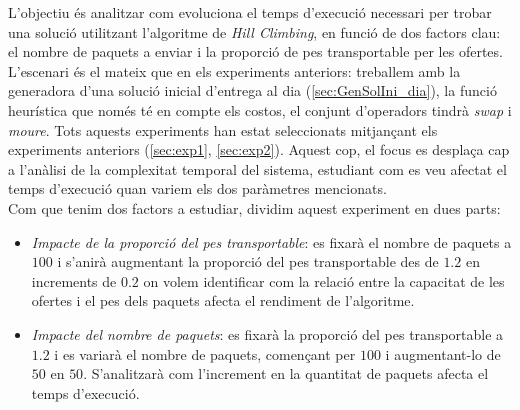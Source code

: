 \documentclass[a4paper]{article}
\begin{document}
	L'objectiu és analitzar com evoluciona el temps d'execució necessari per trobar una solució utilitzant l'algoritme de \textit{Hill Climbing}, en funció de dos factors clau: el nombre de paquets a enviar i la proporció de pes transportable per les ofertes. \\

	L'escenari és el mateix que en els experiments anteriors: treballem amb la generadora d'una solució inicial d'entrega al dia (\ref{sec:GenSolIni_dia}), la funció heurística que només té en compte els costos, el conjunt d'operadors tindrà \textit{swap} i \textit{moure}. Tots aquests experiments han estat seleccionats mitjançant els experiments anteriors (\ref{sec:exp1}, \ref{sec:exp2}). Aquest cop, el focus es desplaça cap a l'anàlisi de la complexitat temporal del sistema, estudiant com es veu afectat el temps d'execució quan variem els dos paràmetres mencionats. \\

	Com que tenim dos factors a estudiar, dividim aquest experiment en dues parts:
	
	\begin{itemize}
		\item \emph{Impacte de la proporció del pes transportable}: es fixarà el nombre de paquets a $100$ i s'anirà augmentant la proporció del pes transportable des de $1.2$ en increments de $0.2$ on volem identificar com la relació entre la capacitat de les ofertes i el pes dels paquets afecta el rendiment de l'algoritme.

		\item \emph{Impacte del nombre de paquets}: es fixarà la proporció del pes transportable a $1.2$ i es variarà el nombre de paquets, començant per $100$ i augmentant-lo de $50$ en $50$. S'analitzarà com l'increment en la quantitat de paquets afecta el temps d'execució.

	\end{itemize}
\end{document}
